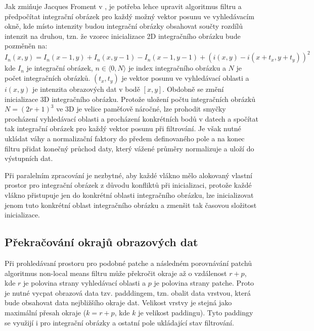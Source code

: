 Jak zmiňuje Jacques Froment v \cite{nlm2014:froment}, je potřeba lehce upravit algoritmus filtru a předpočítat integrační obrázek pro každý možný vektor posunu ve vyhledávacím okně, kde místo intenzity budou integrační obrázky obsahovat součty rozdílů intenzit na druhou, tzn. že vzorec inicializace 2D integračního obrázku bude pozměněn na:
\begin{equation}
    I_{n}(x,y) = I_{n}(x-1,y)+I_{n}(x,y-1)-I_{n}(x-1,y-1)+(i(x,y)-i(x+t_x,y+t_y))^2
\end{equation}
kde $I_{n}$ je integrační obrázek, $n\in\langle0,N\rangle$ je index integračního obrázku a $N$ je počet integračních obrázků. $(t_x,t_y)$ je vektor posunu ve vyhledávací oblasti a $i(x,y)$ je intenzita obrazových dat v bodě $[x,y]$. Obdobně se změní inicializace 3D integračního obrázku. Protože uložení počtu integračních obrázků $N = (2r + 1)^3$ ve 3D je velice paměťově náročné, lze prohodit smyčky procházení vyhledávací oblasti a procházení konkrétních bodů v datech a spočítat tak integrační obrázek pro každý vektor posunu při filtrování. Je však nutné ukládat váhy a normalizační faktory do předem definovaného pole a na konec filtru přidat konečný průchod daty, který vážené průměry normalizuje a uloží do výstupních dat.

Při paralelním zpracování je nezbytné, aby každé vlákno mělo alokovaný vlastní prostor pro integrační obrázek z důvodu konfliktů při inicializaci, protože každé vlákno přistupuje jen do konkrétní oblasti integračního obrázku, lze inicializovat jenom tuto konkrétní oblast integračního obrázku a zmenšit tak časovou složitost inicializace. 

\subsection*{Překračování okrajů obrazových dat}
Při prohledávaní prostoru pro podobné patche a následném porovnávání patchů algoritmus non-local means filtru může překročit okraje až o vzdálenost $r + p$, kde $r$ je polovina strany vyhledávací oblasti a $p$ je polovina strany patche. Proto je nutné vycpat obrazová data tzv. padddingem, tzn. obalit data vrstvou, která bude obsahovat data nejbližšího okraje dat. Velikost vrstvy je stejná jako maximální přesah okraje ($k = r + p$, kde $k$ je velikost paddingu). Tyto paddingy se využijí i pro integrační obrázky a ostatní pole ukládající stav filtrování.

